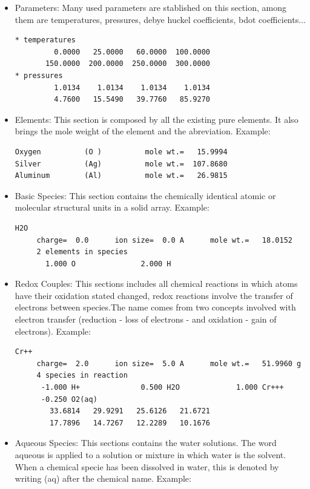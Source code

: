 \documentclass[ppgc,mestrado,english]{iiufrgs}
\begin{document}
\begin{itemize}
\item Parameters: Many used parameters are stablished on this section, among them are temperatures, pressures, debye huckel coefficients, bdot coefficients...
\begin{lstlisting}[frame=single, caption=Excerpt of the section Parameters]
* temperatures
         0.0000   25.0000   60.0000  100.0000
       150.0000  200.0000  250.0000  300.0000
* pressures
         1.0134    1.0134    1.0134    1.0134
         4.7600   15.5490   39.7760   85.9270
\end{lstlisting}
\item Elements: This section is composed by all the existing pure elements. It also brings the mole weight of the element and the abreviation. Example: 
\begin{lstlisting}[frame=single, caption=Excerpt of the section Elements]
Oxygen          (O )          mole wt.=   15.9994
Silver          (Ag)          mole wt.=  107.8680
Aluminum        (Al)          mole wt.=   26.9815
\end{lstlisting}
\item Basic Species: This section contains the chemically identical atomic or molecular structural units in a solid array. Example:
\begin{lstlisting}[frame=single, caption=Excerpt of the section Basic Species]
H2O
     charge=  0.0      ion size=  0.0 A      mole wt.=   18.0152
     2 elements in species
       1.000 O               2.000 H
\end{lstlisting}

\item Redox Couples: This sections includes all chemical reactions in which atoms have their oxidation stated changed, redox reactions involve the transfer of electrons between species.The name comes from two concepts involved with electron transfer (reduction - loss of electrons - and oxidation - gain of electrons). Example:
\begin{lstlisting}[frame=single, caption=Excerpt of the section Redox Couples]
Cr++
     charge=  2.0      ion size=  5.0 A      mole wt.=   51.9960 g
     4 species in reaction
      -1.000 H+              0.500 H2O             1.000 Cr+++
      -0.250 O2(aq)
        33.6814   29.9291   25.6126   21.6721
        17.7896   14.7267   12.2289   10.1676
\end{lstlisting}

\item Aqueous Species: This sections contains the water solutions. The word aqueous is applied to a solution or mixture in which water is the solvent. When a chemical specie has been dissolved in water, this is denoted by writing (aq) after the chemical name. Example:


\end{itemize}
\end{document}
